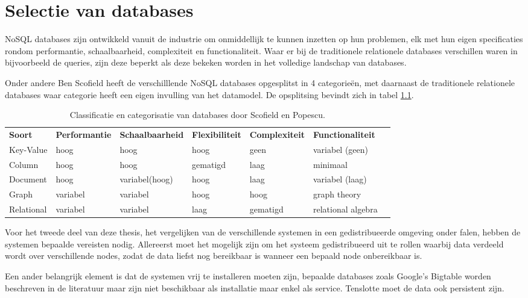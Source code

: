 \chapter{Selectie van databases}
NoSQL databases zijn ontwikkeld vanuit de industrie om onmiddellijk te kunnen inzetten op hun problemen, elk met hun eigen specificaties rondom performantie, schaalbaarheid, complexiteit en functionaliteit. Waar er bij de traditionele relationele databases verschillen waren in bijvoorbeeld de queries, zijn deze beperkt als deze bekeken worden in het volledige landschap van databases. 

Onder andere Ben Scofield heeft de verschilllende NoSQL databases opgesplitst in 4 categorieën, met daarnaast de traditionele relationele databases waar categorie heeft een eigen invulling van het datamodel. De opsplitsing bevindt zich in tabel \ref{table:selectie-classificatie}\cite{Strauch.NoSQL}.
\begin{table}[!h]
	\resizebox{\textwidth}{!} {
		\begin{tabular}{l l l l l l l}
			\textbf{Soort} & \textbf{Performantie} & \textbf{Schaalbaarheid} & 			\textbf{Flexibiliteit} & \textbf{Complexiteit} & \textbf{Functionaliteit} \\
			Key-Value & hoog & hoog & hoog & geen & variabel (geen) \\
			Column & hoog & hoog & gematigd & laag & minimaal \\
			Document & hoog & variabel(hoog) & hoog & laag & variabel (laag) \\
			Graph & variabel & variabel & hoog & hoog & graph theory \\
			Relational & variabel & variabel & laag & gematigd & relational algebra \\
		\end{tabular}
	}
	\label{table:selectie-classificatie}
	\caption{Classificatie en categorisatie van databases door Scofield en Popescu. \cite{categorizatie-sco10} \cite{categorizatie-pop10b} }
\end{table}

Voor het tweede deel van deze thesis, het vergelijken van de verschillende systemen in een gedistribueerde omgeving onder falen, hebben de systemen bepaalde vereisten nodig. Allereerst moet het mogelijk zijn om het systeem gedistribueerd uit te rollen waarbij data verdeeld wordt over verschillende nodes, zodat de data liefst nog bereikbaar is wanneer een bepaald node onbereikbaar is. 

Een ander belangrijk element is dat de systemen vrij te installeren moeten zijn, bepaalde databases zoals Google's Bigtable worden beschreven in de literatuur maar zijn niet beschikbaar als installatie maar enkel als service. Tenslotte moet de data ook persistent zijn. 

